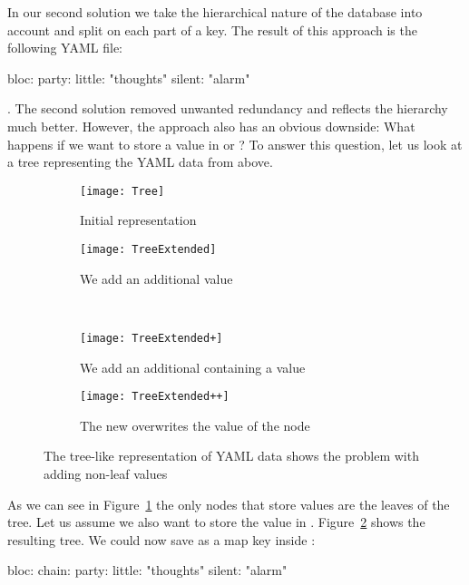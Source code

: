 In our second solution we take the hierarchical nature of the database into account and split on each part of a key. The result of this approach is the following YAML file:

\begin{yamlcode}
  bloc:
    party:
      little: "thoughts"
      silent: "alarm"
\end{yamlcode}

. The second solution removed unwanted redundancy and reflects the hierarchy much better. However, the approach also has an obvious downside: What happens if we want to store a value in  or ? To answer this question, let us look at a tree representing the YAML data from above.

\begin{figure}
  \centering
  \begin{subfigure}[t]{.4\textwidth}
    \centering
    \texttt{[image: Tree]}
    \caption{Initial representation}
    \label{fig:tree}
  \end{subfigure}
  \qquad
  \begin{subfigure}[t]{.4\textwidth}
    \centering
    \texttt{[image: TreeExtended]}
    \caption{We add an additional value}
    \label{fig:tree_extended}
  \end{subfigure}\\
  \begin{subfigure}[t]{.4\textwidth}
    \centering
    \texttt{[image: TreeExtended+]}
    \caption{We add an additional  containing a value}
  \end{subfigure}
  \quad
  \begin{subfigure}[t]{.4\textwidth}
    \centering
    \texttt{[image: TreeExtended++]}
    \caption{The new  overwrites the value of the node }
    \label{fig:tree_extended++}
  \end{subfigure}
  \caption{The tree-like representation of YAML data shows the problem with adding non-leaf values}
\end{figure}

As we can see in Figure~\ref{fig:tree} the only nodes that store values are the leaves of the tree. Let us assume we also want to store the value  in . Figure~\ref{fig:tree_extended} shows the resulting tree. We could now save  as a map key inside :

\begin{yamlcode}
  bloc:
    chain:
    party:
      little: "thoughts"
      silent: "alarm"
\end{yamlcode}

